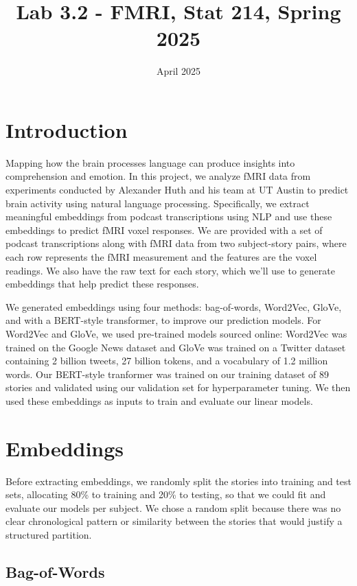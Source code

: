 \documentclass{article}
\title{Lab 3.2 - FMRI, Stat 214, Spring 2025\vspace{-2em}}
\date{April 2025}
\begin{document}
\maketitle

\section{Introduction}

Mapping how the brain processes language can produce insights into comprehension and emotion. In this project, we analyze fMRI data from experiments conducted by Alexander Huth and his team at UT Austin to predict brain activity using natural language processing. Specifically, we extract meaningful embeddings from podcast transcriptions using NLP and use these embeddings to predict fMRI voxel responses. We are provided with a set of podcast transcriptions along with fMRI data from two subject-story pairs, where each row represents the fMRI measurement and the features are the voxel readings. We also have the raw text for each story, which we’ll use to generate embeddings that help predict these responses.

We generated embeddings using four methods: bag-of-words, Word2Vec, GloVe, and with a BERT-style transformer, to improve our prediction models. For Word2Vec and GloVe, we used pre-trained models sourced online: Word2Vec was trained on the Google News dataset and GloVe was trained on a Twitter dataset containing 2 billion tweets, 27 billion tokens, and a vocabulary of 1.2 million words. Our BERT-style tranformer was trained on our training dataset of 89 stories and validated using our validation set for hyperparameter tuning. We then used these embeddings as inputs to train and evaluate our linear models.

\section{Embeddings}

Before extracting embeddings, we randomly split the stories into training and test sets, allocating 80\% to training and 20\% to testing, so that we could fit and evaluate our models per subject. We chose a random split because there was no clear chronological pattern or similarity between the stories that would justify a structured partition. 

\subsection{Bag-of-Words}
\end{document}

